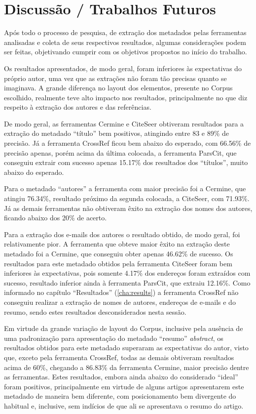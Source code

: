 
\chapter{Discussão / Trabalhos Futuros} %
\label{cha:conclusion}

Após todo o processo de pesquisa, de extração dos metadados pelas ferramentas analisadas e coleta de seus respectivos resultados, algumas considerações podem ser feitas, objetivando cumprir com os objetivos propostos no início do trabalho.

Os resultados apresentados, de modo geral, foram inferiores às expectativas do próprio autor, uma vez que as extrações não foram tão precisas quanto se imaginava. A grande diferença no layout dos elementos, presente no Corpus escolhido, realmente teve alto impacto nos resultados, principalmente no que diz respeito à extração dos autores e das referências.

De modo geral, as ferramentas Cermine e CiteSeer obtiveram resultados para a extração do metadado ``título'' bem positivos, atingindo entre 83 e 89\% de precisão. Já a ferramenta CrossRef ficou bem abaixo do esperado, com 66.56\% de precisão apenas, porém acima da última colocada, a ferramenta ParsCit, que conseguiu extrair com sucesso apenas 15.17\% dos resultados dos ``títulos'', muito abaixo do esperado.

Para o metadado ``autores'' a ferramenta com maior precisão foi a Cermine, que atingiu 76.34\%, resultado próximo da segunda colocada, a CiteSeer, com 71.93\%. Já as demais ferramentas não obtiveram êxito na extração dos nomes dos autores, ficando abaixo dos 20\% de acerto.

Para a extração dos e-mails dos autores o resultado obtido, de modo geral, foi relativamente pior. A ferramenta que obteve maior êxito na extração deste metadado foi a Cermine, que conseguiu obter apenas 46.62\% de sucesso. Os resultados para este metadado obtidos pela ferramenta CiteSeer foram bem inferiores às expectativas, pois somente 4.17\% dos endereços foram extraídos com sucesso, resultado inferior ainda à ferramenta ParsCit, que extraiu 12.16\%. Como informado no capítulo ``Resultados'' (\autoref{cha:results}) a ferramenta CrossRef não conseguiu realizar a extração de nomes de autores, endereços de e-mails e do resumo, sendo estes resultados desconsiderados nesta sessão.

Em virtude da grande variação de layout do Corpus, inclusive pela ausência de uma padronização para apresentação do metadado ``resumo'' \emph{abstract}, os resultados obtidos para este metadado superaram as expectativas do autor, visto que, exceto pela ferramenta CrossRef, todas as demais obtiveram resultados acima de 60\%, chegando a 86.83\% da ferramenta Cermine, maior precisão dentre as ferramentas. Estes resultados, embora ainda abaixo do considerado ``ideal'' foram positivos, principalmente em virtude de alguns artigos apresentarem este metadado de maneira bem diferente, com posicionamento bem divergente do habitual e, inclusive, sem indícios de que ali se apresentava o resumo do artigo.


